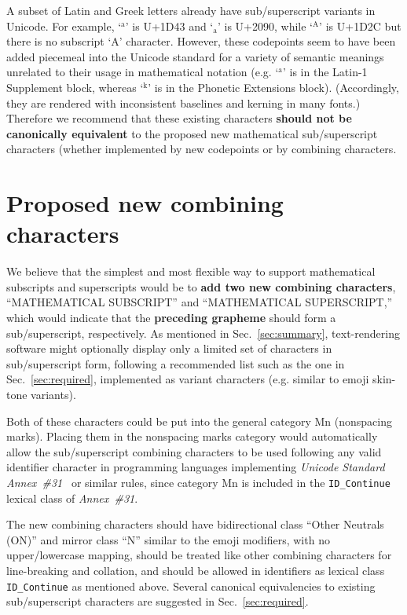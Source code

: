 \documentclass[10pt,english]{article}
\newcommand{\secref}[1]{Sec.~\ref{sec:#1}}
\begin{document}
A subset of Latin and Greek letters already have sub/superscript variants in Unicode.  For example, `$^\mathrm{a}$' is U+1D43 and `$_\mathrm{a}$' is U+2090, while `$^\mathrm{A}$' is U+1D2C but there is no subscript `A' character.   However, these codepoints seem to have been added piecemeal into the Unicode standard for a variety of semantic meanings unrelated to their usage in mathematical notation (e.g. `$^\mathrm{a}$' is in the Latin-1 Supplement block, whereas `$^\mathrm{k}$' is in the Phonetic Extensions block).   (Accordingly, they are rendered with inconsistent baselines and kerning in many fonts.) Therefore we recommend that these existing characters \textbf{should not be canonically equivalent} to the proposed new mathematical sub/superscript characters (whether implemented by new codepoints or by combining characters.

\section{Proposed new combining characters}

We believe that the simplest and most flexible way to support mathematical subscripts and superscripts would be to \textbf{add two new combining characters}, ``MATHEMATICAL SUBSCRIPT'' and ``MATHEMATICAL SUPERSCRIPT,'' which would indicate that the \textbf{preceding grapheme} should form a sub/superscript, respectively.   As mentioned in \secref{summary}, text-rendering software might optionally display only a limited set of characters in sub/superscript form, following a recommended list such as the one in \secref{required}, implemented as variant characters (e.g. similar to emoji skin-tone variants).

Both of these characters could be put into the general category Mn (nonspacing marks). Placing them in the nonspacing marks category would automatically allow the sub/superscript combining characters to be used following any valid identifier character in programming languages implementing \emph{Unicode Standard Annex~\#31}~\cite{UAX31} or similar rules, since category Mn is included in the \texttt{ID\_Continue} lexical class of \emph{Annex~\#31}.

The new combining characters should have bidirectional class ``Other Neutrals (ON)'' and mirror class ``N'' similar to the emoji modifiers, with no upper/lowercase mapping, should be treated like other combining characters for line-breaking and collation, and should be allowed in identifiers as lexical class \texttt{ID\_Continue} as mentioned above.   Several  canonical equivalencies to existing sub/superscript characters are suggested in \secref{required}.
\end{document}
